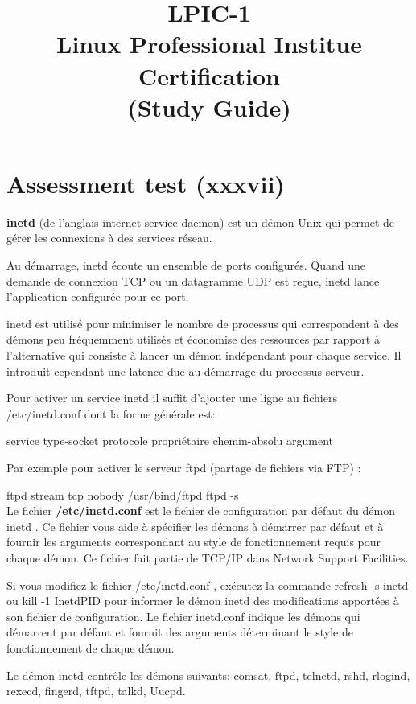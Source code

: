 \documentclass[a4paper]{article}
\title{%
  LPIC-1 \\
  \large Linux Professional Institue Certification \\
    (Study Guide)}
\author{}
\begin{document}
\maketitle

\section*{Assessment test (xxxvii)}
	\textbf{inetd} (de l'anglais internet service daemon) est un démon Unix qui permet de gérer les connexions à des services réseau. 

	Au démarrage, inetd écoute un ensemble de ports configurés. Quand une demande de connexion TCP ou un datagramme UDP est reçue, inetd lance l'application configurée pour ce port.

	inetd est utilisé pour minimiser le nombre de processus qui correspondent à des démons peu fréquemment utilisés et économise des ressources par rapport à l'alternative qui consiste à lancer un démon indépendant pour chaque service. Il introduit cependant une latence due au démarrage du processus serveur. 

	Pour activer un service inetd il suffit d'ajouter une ligne au fichiers /etc/inetd.conf dont la forme générale est:

	service type-socket protocole propriétaire chemin-absolu argument

	Par exemple pour activer le serveur ftpd (partage de fichiers via FTP) :

	ftpd stream tcp nobody /usr/bind/ftpd ftpd -s \\

	Le fichier \textbf{/etc/inetd.conf} est le fichier de configuration par défaut du démon inetd . Ce fichier vous aide à spécifier les démons à démarrer par défaut et à fournir les arguments correspondant au style de fonctionnement requis pour chaque démon. Ce fichier fait partie de TCP/IP dans Network Support Facilities.

	Si vous modifiez le fichier /etc/inetd.conf , exécutez la commande refresh -s inetd ou kill -1 InetdPID pour informer le démon inetd des modifications apportées à son fichier de configuration. Le fichier inetd.conf indique les démons qui démarrent par défaut et fournit des arguments déterminant le style de fonctionnement de chaque démon.

	Le démon inetd contrôle les démons suivants: comsat, ftpd, telnetd, rshd, rlogind, rexecd, fingerd, tftpd, talkd, Uucpd. \\
\end{document}
